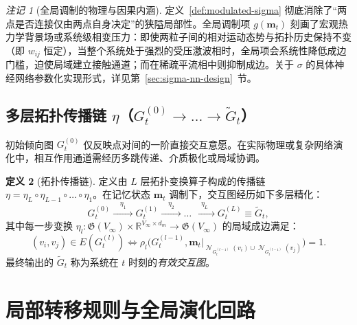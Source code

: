 \documentclass[11pt,a4paper]{article}
\numberwithin{equation}{section}
\theoremstyle{definition}
\newtheorem{definition}{定义}[section]
\theoremstyle{remark}
\newtheorem{remark}[definition]{注记}
\DeclareMathOperator{\Ncal}{\mathcal{N}}   %
\begin{document}
	\begin{remark}[全局调制的物理与因果内涵]\label{rem:global-modulation-concept}
		定义~\ref{def:modulated-sigma} 彻底消除了“两点是否连接仅由两点自身决定”的狭隘局部性。全局调制项 $g(\mathbf{m}_t)$ 刻画了宏观热力学背景场或系统级相变压力：即使两粒子间的相对运动态势与拓扑历史保持不变（即 $w_{ij}$ 恒定），当整个系统处于强烈的受压激波相时，全局项会系统性降低成边门槛，迫使局域建立接触通道；而在稀疏平流相中则抑制成边。关于 $\sigma$ 的具体神经网络参数化实现形式，详见第~\ref{sec:sigma-nn-design}~节。
	\end{remark}
	
	\subsection{\texorpdfstring{多层拓扑传播链 $\eta$（$G_t^{(0)} \to \dots \to \widetilde{G}_t$）}{多层拓扑传播链 η（G_t^(0) -> ... -> G_t~）}}
	
	初始倾向图 $G_t^{(0)}$ 仅反映点对间的一阶直接交互意愿。在实际物理或复杂网络演化中，相互作用通道需经历多跳传递、介质极化或局域协调。

	\begin{definition}[拓扑传播链]\label{def:eta-chain}
		定义由 $L$ 层拓扑变换算子构成的传播链 $\eta = \eta_L \circ \eta_{L-1} \circ \dots \circ \eta_1$。在记忆状态 $\mathbf{m}_t$ 调制下，交互图经历如下多层精化：
		\begin{equation}
			G_t^{(0)} \xrightarrow{\quad\eta_1\quad} G_t^{(1)} \xrightarrow{\quad\eta_2\quad} \dots \xrightarrow{\quad\eta_L\quad} G_t^{(L)} \equiv \widetilde{G}_t,
			\label{eq:eta-refinement}
		\end{equation}
		其中每一步变换 $\eta_l: \mathfrak{G}(V_\infty) \times \mathbb{R}^{V_\infty \times d_m} \to \mathfrak{G}(V_\infty)$ 的局域成边满足：
		\begin{equation}
			(v_i, v_j) \in E(G_t^{(l)}) \iff \rho_l\Big(G_t^{(l-1)}, \mathbf{m}_t|_{\Ncal_{G_t^{(l-1)}}(v_i) \cup \Ncal_{G_t^{(l-1)}}(v_j)}\Big) = 1.
			\label{eq:eta-local}
		\end{equation}
		最终输出的 $\widetilde{G}_t$ 称为系统在 $t$ 时刻的\emph{有效交互图}。
	\end{definition}
	
	\section{\texorpdfstring{局部转移规则与全局演化回路}{局部转移规则与全局演化回路}}\label{sec:lifecycle}
	
\end{document}
